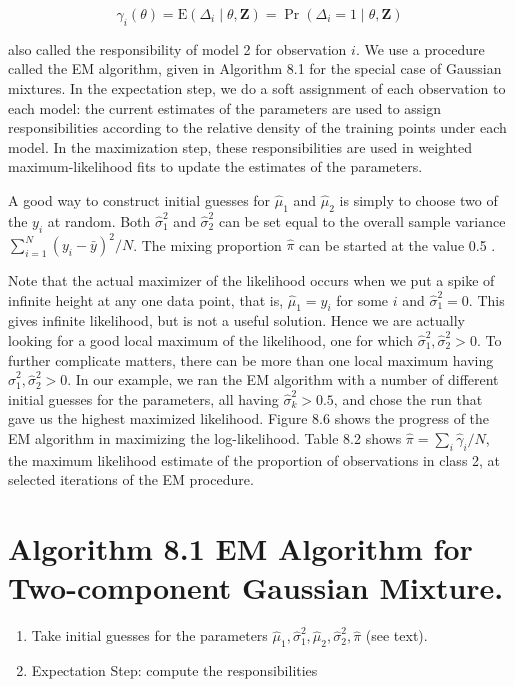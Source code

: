 \documentclass[10pt]{article}
\begin{document}
\begin{equation*}
\gamma_{i}(\theta)=\mathrm{E}\left(\Delta_{i} \mid \theta, \mathbf{Z}\right)=\operatorname{Pr}\left(\Delta_{i}=1 \mid \theta, \mathbf{Z}\right) \tag{8.41}
\end{equation*}


also called the responsibility of model 2 for observation $i$. We use a procedure called the EM algorithm, given in Algorithm 8.1 for the special case of Gaussian mixtures. In the expectation step, we do a soft assignment of each observation to each model: the current estimates of the parameters are used to assign responsibilities according to the relative density of the training points under each model. In the maximization step, these responsibilities are used in weighted maximum-likelihood fits to update the estimates of the parameters.

A good way to construct initial guesses for $\hat{\mu}_{1}$ and $\hat{\mu}_{2}$ is simply to choose two of the $y_{i}$ at random. Both $\hat{\sigma}_{1}^{2}$ and $\hat{\sigma}_{2}^{2}$ can be set equal to the overall sample variance $\sum_{i=1}^{N}\left(y_{i}-\bar{y}\right)^{2} / N$. The mixing proportion $\hat{\pi}$ can be started at the value 0.5 .

Note that the actual maximizer of the likelihood occurs when we put a spike of infinite height at any one data point, that is, $\hat{\mu}_{1}=y_{i}$ for some $i$ and $\hat{\sigma}_{1}^{2}=0$. This gives infinite likelihood, but is not a useful solution. Hence we are actually looking for a good local maximum of the likelihood, one for which $\hat{\sigma}_{1}^{2}, \hat{\sigma}_{2}^{2}>0$. To further complicate matters, there can be more than one local maximum having $\hat{\sigma}_{1}^{2}, \hat{\sigma}_{2}^{2}>0$. In our example, we ran the EM algorithm with a number of different initial guesses for the parameters, all having $\hat{\sigma}_{k}^{2}>0.5$, and chose the run that gave us the highest maximized likelihood. Figure 8.6 shows the progress of the EM algorithm in maximizing the log-likelihood. Table 8.2 shows $\hat{\pi}=\sum_{i} \hat{\gamma}_{i} / N$, the maximum likelihood estimate of the proportion of observations in class 2, at selected iterations of the EM procedure.

\section*{Algorithm 8.1 EM Algorithm for Two-component Gaussian Mixture.}
\begin{enumerate}
  \item Take initial guesses for the parameters $\hat{\mu}_{1}, \hat{\sigma}_{1}^{2}, \hat{\mu}_{2}, \hat{\sigma}_{2}^{2}, \hat{\pi}$ (see text).
  \item Expectation Step: compute the responsibilities
\end{enumerate}
\end{document}
